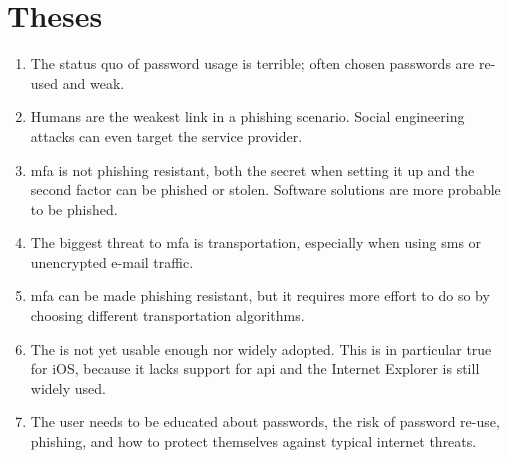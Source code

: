 \chapter*{Theses}
\thispagestyle{noheader}

\begin{enumerate}
	\setlength{\itemsep}{1cm}
	\item The status quo of password usage is terrible; often chosen passwords are re-used and weak.
	\item Humans are the weakest link in a phishing scenario. Social engineering attacks can even target the service provider.
	\item \Glsdesc{mfa} is not phishing resistant, both the secret when setting it up and the second factor can be phished or stolen. Software solutions are more probable to be phished.
	\item The biggest threat to \glsdesc{mfa} is transportation, especially when using \gls{sms} or unencrypted e-mail traffic.
	\item \Glsdesc{mfa} can be made phishing resistant, but it requires more effort to do so by choosing different transportation algorithms.
	\item The \wa{} is not yet usable enough nor widely adopted. This is in particular true for iOS, because it lacks support for \gls{api} and the Internet Explorer is still widely used.
	\item The user needs to be educated about passwords, the risk of password re-use, phishing, and how to protect themselves against typical internet threats.
\end{enumerate}
